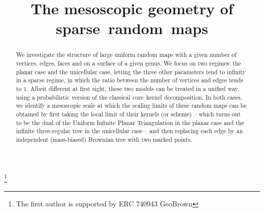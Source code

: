 \documentclass[JEP,XML,SOM,Unicode,NoFloatCountersInSection,NoEqCountersInSection]{cedram}
\theoremstyle{plain}
\theoremstyle{definition}
\theoremstyle{remark}
\begin{document}
\title[The mesoscopic geometry of sparse random maps]{The mesoscopic geometry of sparse~random~maps}

\author[\initial{N.} \lastname{Curien}]{ }
\address{Département de Mathématique, Université Paris-Saclay, Faculté des Sciences d'Orsay\\
Orsay, France}

\author[\initial{I.} \lastname{Kortchemski}]{ }
\address{CNRS et Centre de Mathématiques Appliquées, École Polytechnique\\
Palaiseau, France}

\author[\initial{C.} \lastname{Marzouk}]{ }
\address{CNRS et Centre de Mathématiques Appliquées, École Polytechnique\\
Palaiseau, France}

\thanks{The first author is supported by ERC 740943 GeoBrown}




\begin{abstract}
We investigate the structure of large uniform random maps with a given number of vertices, edges, faces and on a surface of a given genus. We focus on two regimes: the planar case and the unicellular case, letting the three other parameters tend to infinity in a sparse regime, in which the ratio between the number of vertices and edges tends to $1$. Albeit different at first sight, these two models can be treated in a unified way, using a probabilistic version of the classical core--kernel decomposition.
In both cases, we identify a mesoscopic scale at which the scaling limits of these random maps can be obtained by first taking the local limit of their kernels (or scheme) -- which turns out to be the dual of the Uniform Infinite Planar Triangulation in the planar case and the infinite three-regular tree in the unicellular case -- and then replacing each edge by an independent (mass-biased) Brownian tree with two marked points.
\end{abstract}
\end{document}
